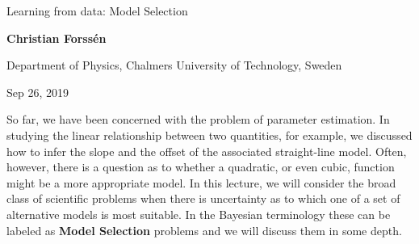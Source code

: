 \documentclass[%
oneside,                 %
final,                   %
10pt]{article}
\begin{document}

\newcommand{\exercisesection}[1]{\subsection*{#1}}







\thispagestyle{empty}

\begin{center}
{\LARGE\bf
\begin{spacing}{1.25}
Learning from data: Model Selection
\end{spacing}
}
\end{center}


\begin{center}
{\bf Christian Forssén}
\end{center}

    \begin{center}
\centerline{{\small Department of Physics, Chalmers University of Technology, Sweden}}
\end{center}
    

\begin{center}
Sep 26, 2019
\end{center}

\vspace{1cm}


So far, we have been concerned with the problem of parameter estimation. In studying the linear relationship between two quantities, for example, we discussed how to infer the slope and the offset of the associated straight-line model. Often, however, there is a question as to whether a quadratic, or even cubic, function might be a more appropriate model. In this lecture, we will consider the broad class of scientific problems when there is uncertainty as to which one of a set of alternative models is most suitable. In the Bayesian terminology these can be labeled as \textbf{Model Selection} problems and we will discuss them in some depth.
\end{document}

